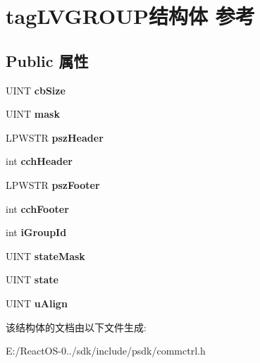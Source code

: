 \hypertarget{structtag_l_v_g_r_o_u_p}{}\section{tag\+L\+V\+G\+R\+O\+U\+P结构体 参考}
\label{structtag_l_v_g_r_o_u_p}
\subsection*{Public 属性}
\begin{DoxyCompactItemize}
\item 
\mbox{\label{structtag_l_v_g_r_o_u_p_a85e9a47d76983152f629404932ed719d}} 
U\+I\+NT {\bfseries cb\+Size}
\item 
\mbox{\label{structtag_l_v_g_r_o_u_p_aa818f4177eb82d5efcf14769172f3339}} 
U\+I\+NT {\bfseries mask}
\item 
\mbox{\label{structtag_l_v_g_r_o_u_p_affcbefabfcc3fd643b78bfc7f12d0762}} 
L\+P\+W\+S\+TR {\bfseries psz\+Header}
\item 
\mbox{\label{structtag_l_v_g_r_o_u_p_a34c7f9f6ed0a88b5e9fb75d8bb45d581}} 
int {\bfseries cch\+Header}
\item 
\mbox{\label{structtag_l_v_g_r_o_u_p_ae3965540f0544675f8a5b1d774fa9c27}} 
L\+P\+W\+S\+TR {\bfseries psz\+Footer}
\item 
\mbox{\label{structtag_l_v_g_r_o_u_p_a6ecb9052be3f9b0fdd842ee220bcffc2}} 
int {\bfseries cch\+Footer}
\item 
\mbox{\label{structtag_l_v_g_r_o_u_p_a5ced1cb97b7ea8011b8cae5640d24f7f}} 
int {\bfseries i\+Group\+Id}
\item 
\mbox{\label{structtag_l_v_g_r_o_u_p_a8b8bea12886811b63b3ad4f4b9edfef4}} 
U\+I\+NT {\bfseries state\+Mask}
\item 
\mbox{\label{structtag_l_v_g_r_o_u_p_a76eeb71e3b6dddb2a8476af6a1c35c48}} 
U\+I\+NT {\bfseries state}
\item 
\mbox{\label{structtag_l_v_g_r_o_u_p_aac5c3f4155ff8559288ec7a071bceef8}} 
U\+I\+NT {\bfseries u\+Align}
\end{DoxyCompactItemize}


该结构体的文档由以下文件生成\+:\begin{DoxyCompactItemize}
\item 
E\+:/\+React\+O\+S-\/0../sdk/include/psdk/commctrl.\+h\end{DoxyCompactItemize}
